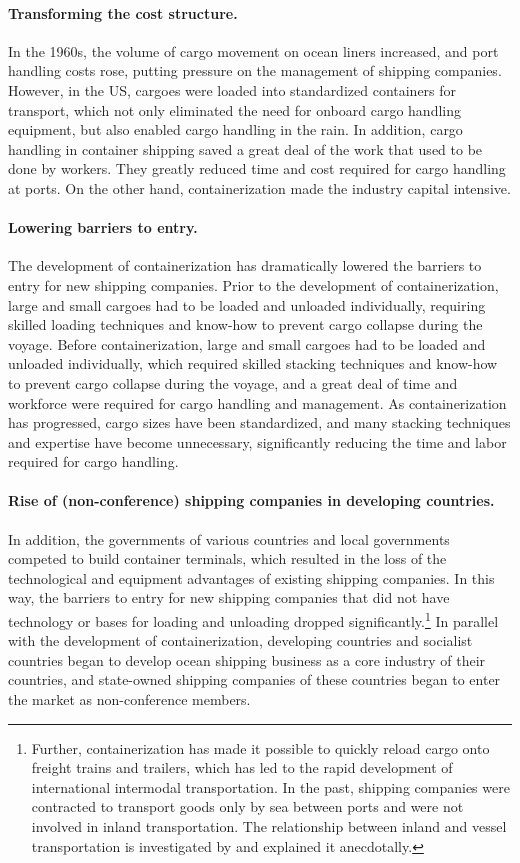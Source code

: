 \documentclass[11pt]{article}
\begin{document}
\paragraph{Transforming the cost structure.}
In the 1960s, the volume of cargo movement on ocean liners increased, and port handling costs rose, putting pressure on the management of shipping companies. However, in the US, cargoes were loaded into standardized containers for transport, which not only eliminated the need for onboard cargo handling equipment, but also enabled cargo handling in the rain. In addition, cargo handling in container shipping saved a great deal of the work that used to be done by workers. They greatly reduced time and cost required for cargo handling at ports. On the other hand, containerization made the industry capital intensive.

\paragraph{Lowering barriers to entry.}
The development of containerization has dramatically lowered the barriers to entry for new shipping companies. Prior to the development of containerization, large and small cargoes had to be loaded and unloaded individually, requiring skilled loading techniques and know-how to prevent cargo collapse during the voyage. Before containerization, large and small cargoes had to be loaded and unloaded individually, which required skilled stacking techniques and know-how to prevent cargo collapse during the voyage, and a great deal of time and workforce were required for cargo handling and management. As containerization has progressed, cargo sizes have been standardized, and many stacking techniques and expertise have become unnecessary, significantly reducing the time and labor required for cargo handling.

\paragraph{Rise of (non-conference) shipping companies in developing countries.}
In addition, the governments of various countries and local governments competed to build container terminals, which resulted in the loss of the technological and equipment advantages of existing shipping companies. In this way, the barriers to entry for new shipping companies that did not have technology or bases for loading and unloading dropped significantly.\footnote{Further, containerization has made it possible to quickly reload cargo onto freight trains and trailers, which has led to the rapid development of international intermodal transportation. In the past, shipping companies were contracted to transport goods only by sea between ports and were not involved in inland transportation. The relationship between inland and vessel transportation is investigated by \cite{bernhofen2016estimating} and \cite{levinson2016box} explained it anecdotally. } In parallel with the development of containerization, developing countries and socialist countries began to develop ocean shipping business as a core industry of their countries, and state-owned shipping companies of these countries began to enter the market as non-conference members.
\end{document}
